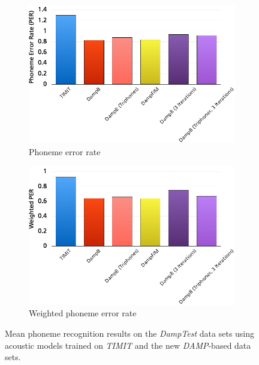 \begin{figure}
	\centering
	\begin{subfigure}[t]{0.5\textwidth}
		\includegraphics[width=\textwidth]{images/res_phonerec.png}
		\caption{Phoneme error rate}
		
	\end{subfigure}%
	\begin{subfigure}[t]{0.5\textwidth}
		\includegraphics[width=\textwidth]{images/res_phonerec_w.png}
		\caption{Weighted phoneme error rate}
	\end{subfigure}
	\caption{Mean phoneme recognition results on the \textit{DampTest} data sets using acoustic models trained on \textit{TIMIT} and the new \textit{DAMP}-based data sets.}\label{fig:res_phonerec}
\end{figure}


